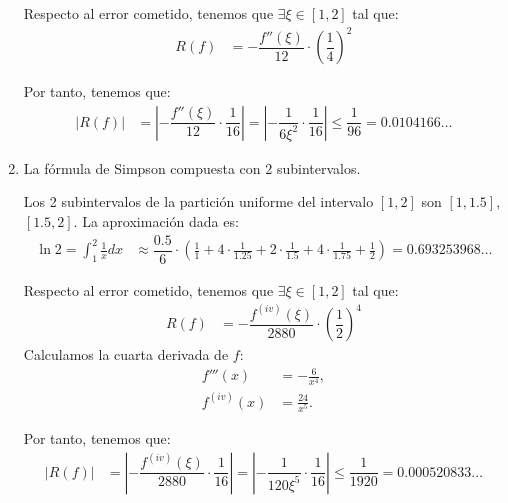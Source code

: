 \begin{ejercicio}
\begin{enumerate}
        Respecto al error cometido, tenemos que $\exists \xi \in [1, 2]$ tal que:
        \begin{align*}
            R(f) &= -\dfrac{f''(\xi)}{12} \cdot \left(\dfrac{1}{4}\right)^2
        \end{align*}

        Por tanto, tenemos que:
        \begin{align*}
            |R(f)| &= \left| -\dfrac{f''(\xi)}{12} \cdot \dfrac{1}{16} \right| = \left| -\dfrac{1}{6\xi^2} \cdot \dfrac{1}{16} \right| \leq \dfrac{1}{96} = 0.0104166\ldots
        \end{align*}
        \item La fórmula de Simpson compuesta con 2 subintervalos.
        
        Los 2 subintervalos de la partición uniforme del intervalo $[1, 2]$ son $[1, 1.5]$, $[1.5, 2]$. La aproximación dada es:
        \begin{align*}
            \ln 2 = \int_{1}^{2} \frac{1}{x} dx &\approx \dfrac{0.5}{6}\cdot \left(\frac{1}{1} + 4\cdot \frac{1}{1.25} + 2\cdot \frac{1}{1.5} + 4\cdot \frac{1}{1.75} + \frac{1}{2}\right) = 0.693253968\ldots
        \end{align*}

        Respecto al error cometido, tenemos que $\exists \xi \in [1, 2]$ tal que:
        \begin{align*}
            R(f) &= -\dfrac{f^{(iv)}(\xi)}{2880} \cdot \left(\dfrac{1}{2}\right)^4
        \end{align*}
        Calculamos la cuarta derivada de $f$:
        \begin{align*}
            f'''(x) &= -\frac{6}{x^4},\\
            f^{(iv)}(x) &= \frac{24}{x^5}.
        \end{align*}

        Por tanto, tenemos que:
        \begin{align*}
            |R(f)| &= \left| -\dfrac{f^{(iv)}(\xi)}{2880} \cdot \dfrac{1}{16} \right| = \left| -\dfrac{1}{120\xi^5} \cdot \dfrac{1}{16} \right| \leq \dfrac{1}{1920} = 0.000520833\ldots
        \end{align*}
    \end{enumerate}    
\end{ejercicio}

